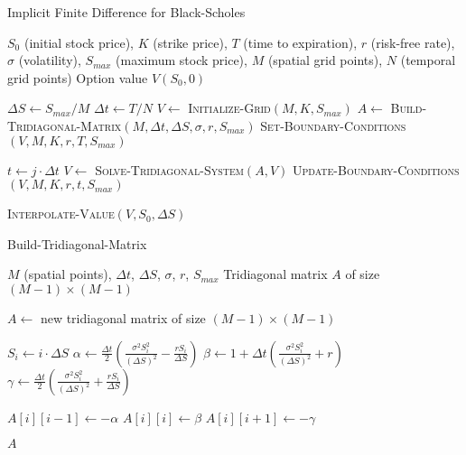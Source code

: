 \documentclass[12pt,a4paper]{article}
\numberwithin{algorithm}{subsection}
\begin{document}
\begin{algorithm}[H]
\caption{Implicit Finite Difference for Black-Scholes}
\begin{algorithmic}[1]
\REQUIRE $S_0$ (initial stock price), $K$ (strike price), $T$ (time to expiration), $r$ (risk-free rate), $\sigma$ (volatility), $S_{max}$ (maximum stock price), $M$ (spatial grid points), $N$ (temporal grid points)
\ENSURE Option value $V(S_0, 0)$

\STATE $\Delta S \leftarrow S_{max} / M$
\STATE $\Delta t \leftarrow T / N$
\STATE $V \leftarrow$ \textsc{Initialize-Grid}$(M, K, S_{max})$
\STATE $A \leftarrow$ \textsc{Build-Tridiagonal-Matrix}$(M, \Delta t, \Delta S, \sigma, r, S_{max})$
\STATE \textsc{Set-Boundary-Conditions}$(V, M, K, r, T, S_{max})$

    \STATE $t \leftarrow j \cdot \Delta t$
    \STATE $V \leftarrow$ \textsc{Solve-Tridiagonal-System}$(A, V)$
    \STATE \textsc{Update-Boundary-Conditions}$(V, M, K, r, t, S_{max})$
\ENDFOR

\RETURN \textsc{Interpolate-Value}$(V, S_0, \Delta S)$
\end{algorithmic}
\end{algorithm}

\begin{algorithm}[H]
\caption{Build-Tridiagonal-Matrix}
\begin{algorithmic}[1]
\REQUIRE $M$ (spatial points), $\Delta t$, $\Delta S$, $\sigma$, $r$, $S_{max}$
\ENSURE Tridiagonal matrix $A$ of size $(M-1) \times (M-1)$

\STATE $A \leftarrow$ new tridiagonal matrix of size $(M-1) \times (M-1)$

    \STATE $S_i \leftarrow i \cdot \Delta S$
    \STATE $\alpha \leftarrow \frac{\Delta t}{2} \left( \frac{\sigma^2 S_i^2}{(\Delta S)^2} - \frac{rS_i}{\Delta S} \right)$
    \STATE $\beta \leftarrow 1 + \Delta t \left( \frac{\sigma^2 S_i^2}{(\Delta S)^2} + r \right)$
    \STATE $\gamma \leftarrow \frac{\Delta t}{2} \left( \frac{\sigma^2 S_i^2}{(\Delta S)^2} + \frac{rS_i}{\Delta S} \right)$
    
        \STATE $A[i][i-1] \leftarrow -\alpha$ 
    \ENDIF
    \STATE $A[i][i] \leftarrow \beta$ 
        \STATE $A[i][i+1] \leftarrow -\gamma$ 
    \ENDIF
\ENDFOR

\RETURN $A$
\end{algorithmic}
\end{algorithm}
\end{document}
